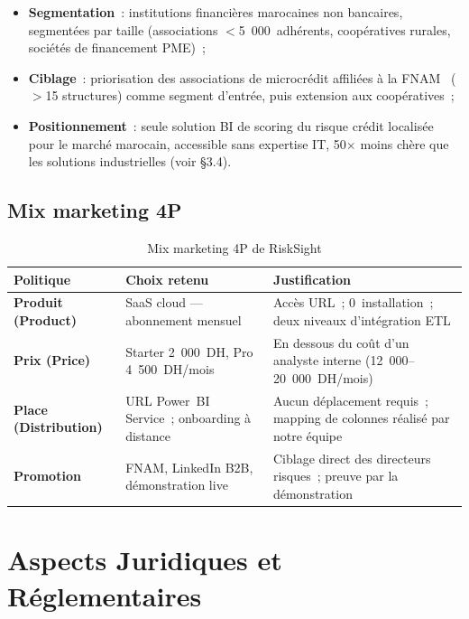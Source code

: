 \documentclass[12pt, a4paper]{report}
\begin{document}
\begin{itemize}[leftmargin=1.5em]
  \item \textbf{Segmentation}~: institutions financières marocaines non bancaires,
    segmentées par taille (associations $<$5~000~adhérents, coopératives rurales,
    sociétés de financement PME)~;
  \item \textbf{Ciblage}~: priorisation des associations de microcrédit affiliées
    à la FNAM~\cite{fnam} ($>$15 structures) comme segment d'entrée, puis extension
    aux coopératives~;
  \item \textbf{Positionnement}~: seule solution BI de scoring du risque crédit
    localisée pour le marché marocain, accessible sans expertise IT, 50$\times$
    moins chère que les solutions industrielles (voir §3.4).
\end{itemize}

\subsection{Mix marketing 4P}

\begin{table}[H]
\centering
\caption{Mix marketing 4P de RiskSight}
\label{tab:4p}
\renewcommand{\arraystretch}{1.5}
\begin{tabularx}{\textwidth}{>{\bfseries}p{2.5cm} p{4cm} X}
\toprule
\rowcolor{primary!12}
Politique & Choix retenu & Justification \\
\midrule
Produit (Product) & SaaS cloud --- abonnement mensuel & Accès URL~; 0~installation~; deux niveaux d'intégration ETL \\
Prix (Price) & Starter 2~000~DH, Pro 4~500~DH/mois & En dessous du coût d'un analyste interne (12~000--20~000~DH/mois) \\
Place (Distribution) & URL Power~BI Service~; onboarding à distance & Aucun déplacement requis~; mapping de colonnes réalisé par notre équipe \\
Promotion & FNAM, LinkedIn B2B, démonstration live & Ciblage direct des directeurs risques~; preuve par la démonstration \\
\bottomrule
\end{tabularx}
\end{table}

\section{Aspects Juridiques et Réglementaires}
\end{document}
